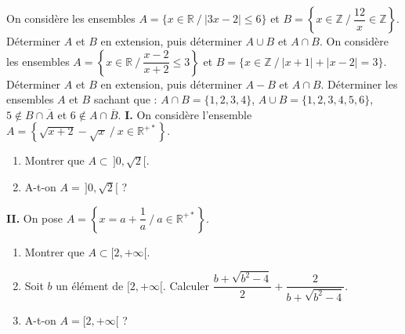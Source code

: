 On considère les ensembles $A=\{x\in\mathbb{R}\ /\ |3x-2|\leq6\}$ et $B=\left\{x\in\mathbb{Z}\ /\ \dfrac{12}{x}\in\mathbb{Z}\right\}$.
Déterminer $A$ et $B$ en extension, puis déterminer $A\cup B$ et $A\cap B$.
\fin
{}
On considère les ensembles $A=\left\{x\in\mathbb{R}\ /\ \dfrac{x-2}{x+2}\leq3\right\}$ et $B=\{x\in\mathbb{Z}\ /\ |x+1|+|x-2|=3\}$.
Déterminer $A$ et $B$ en extension, puis déterminer $A-B$ et $A\cap B$.
\fin
{}
Déterminer les ensembles $A$ et $B$ sachant que : $A\cap B=\{1,2,3,4\}$, $A\cup B=\{1,2,3,4,5,6\}$, $5\notin B\cap\overline A$ et $6\notin A\cap\overline B$.
\fin
{}
\textbf{I.} On considère l'ensemble $A=\left\{\sqrt{x+2}-\sqrt x\ /\ x\in\mathbb{R}^{+*}\right\}$.
\begin{enumerate}
\item Montrer que $A\subset\,]0,\sqrt2[$.
\item A-t-on $A=\,]0,\sqrt2[$ ?
\end{enumerate}
\textbf{II.} On pose $A=\left\{x=a+\dfrac1a\ /\ a\in\mathbb{R}^{+*}\right\}$.
\begin{enumerate}
\item Montrer que $A\subset[2,+\infty[$.
\item Soit $b$ un élément de $[2,+\infty[$. Calculer $\dfrac{b+\sqrt{b^2-4}}{2}+\dfrac{2}{b+\sqrt{b^2-4}}$.
\item A-t-on $A=[2,+\infty[$ ?
\end{enumerate}
\fin
